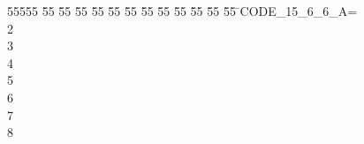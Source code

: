 %
%
\begin{tabbing}
55555 \= 55 \= 55 \= 55 \= 55 \= 55 \= 55 \= 55 \= 55 \= 55 \= 55 \= 55 \= 55 \= \>CODE\_15\_6\_6\_A=\\[0pt]
2\ \\[0pt]
3\ \\[0pt]
4\ \\[0pt]
5\ \\[0pt]
6\ \\[0pt]
7\\[0pt]
8\>\end{tabbing}
